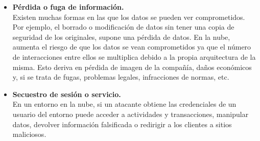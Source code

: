 \begin{itemize}
\item \textbf {Pérdida o fuga de información. } \\ Existen muchas formas en las que los datos se pueden ver comprometidos. Por ejemplo, el borrado o modificación de datos sin tener una copia de seguridad de los originales, supone una pérdida de datos. 
En la nube, aumenta el riesgo de que los datos se vean comprometidos ya que el número de interacciones entre ellos se multiplica debido a la propia arquitectura de la misma. Esto deriva en pérdida de imagen de la compañía, daños económicos y, si se trata de fugas, problemas legales, infracciones de normas, etc.
\item \textbf {Secuestro de sesión o servicio. } \\ En un entorno en la nube, si un atacante obtiene las credenciales de un usuario del entorno puede acceder a actividades y transacciones, manipular datos, devolver información falsificada o redirigir a los clientes a sitios maliciosos.
\end{itemize} 


